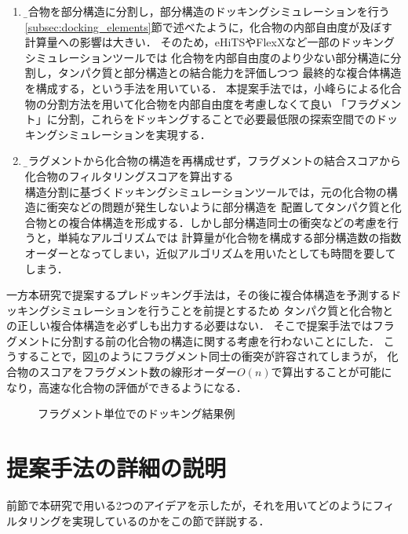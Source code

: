 \begin{enumerate}
\item \b{化合物を部分構造に分割し，部分構造のドッキングシミュレーションを行う}\\
\ref{subsec:docking_elements}節で述べたように，化合物の内部自由度が及ぼす計算量への影響は大きい．
そのため，eHiTS\cite{Zsoldos2007}やFlexX\cite{Rarey1996}など一部のドッキングシミュレーションツールでは
化合物を内部自由度のより少ない部分構造に分割し，タンパク質と部分構造との結合能力を評価しつつ
最終的な複合体構造を構成する，という手法を用いている．
本提案手法では，小峰ら\cite{Shunta2015}による化合物の分割方法を用いて化合物を内部自由度を考慮しなくて良い
「フラグメント」に分割，これらをドッキングすることで必要最低限の探索空間でのドッキングシミュレーションを実現する．

\item \b{フラグメントから化合物の構造を再構成せず，フラグメントの結合スコアから化合物のフィルタリングスコアを算出する}\\
構造分割に基づくドッキングシミュレーションツールでは，元の化合物の構造に衝突などの問題が発生しないように部分構造を
配置してタンパク質と化合物との複合体構造を形成する．しかし部分構造同士の衝突などの考慮を行うと，単純なアルゴリズムでは
計算量が化合物を構成する部分構造数の指数オーダーとなってしまい，近似アルゴリズムを用いたとしても時間を要してしまう．
\end{enumerate}

一方本研究で提案するプレドッキング手法は，その後に複合体構造を予測するドッキングシミュレーションを行うことを前提とするため
タンパク質と化合物との正しい複合体構造を必ずしも出力する必要はない．
そこで提案手法ではフラグメントに分割する前の化合物の構造に関する考慮を行わないことにした．
こうすることで，図\ref{fig:divided_fragment}のようにフラグメント同士の衝突が許容されてしまうが，
化合物のスコアをフラグメント数の線形オーダー$O(n)$で算出することが可能になり，高速な化合物の評価ができるようになる．

\begin{figure}[t]
 \begin{center}
  \caption{フラグメント単位でのドッキング結果例}
  \label{fig:divided_fragment}
 \end{center}
\end{figure}



\section{提案手法の詳細の説明}
前節で本研究で用いる2つのアイデアを示したが，それを用いてどのようにフィルタリングを実現しているのかをこの節で詳説する．

